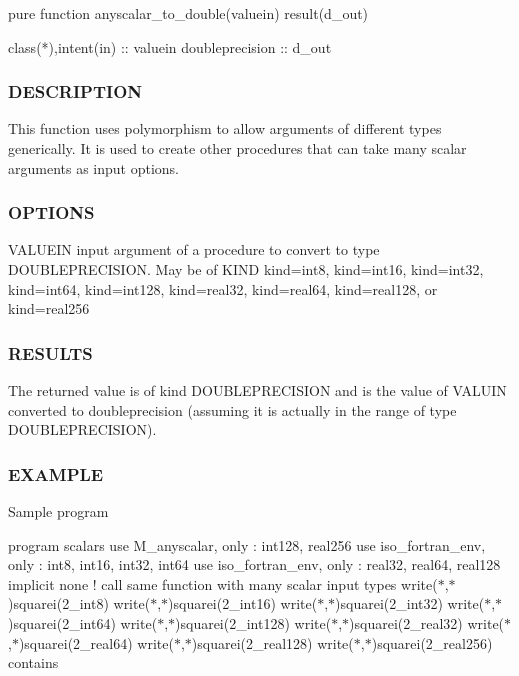 \begin{DoxyVerb}pure function anyscalar_to_double(valuein) result(d_out)

 class(*),intent(in)  :: valuein
 doubleprecision      :: d_out
\end{DoxyVerb}


\subsubsection*{D\+E\+S\+C\+R\+I\+P\+T\+I\+ON}

\begin{DoxyVerb}This function uses polymorphism to allow arguments of different types
generically. It is used to create other procedures that can take
many scalar arguments as input options.
\end{DoxyVerb}


\subsubsection*{O\+P\+T\+I\+O\+NS}

\begin{DoxyVerb}VALUEIN  input argument of a procedure to convert to type DOUBLEPRECISION.
         May be of KIND kind=int8, kind=int16, kind=int32, kind=int64,
         kind=int128, kind=real32, kind=real64, kind=real128,
         or kind=real256
\end{DoxyVerb}
 \subsubsection*{R\+E\+S\+U\+L\+TS}

The returned value is of kind D\+O\+U\+B\+L\+E\+P\+R\+E\+C\+I\+S\+I\+ON and is the value of V\+A\+L\+U\+IN converted to doubleprecision (assuming it is actually in the range of type D\+O\+U\+B\+L\+E\+P\+R\+E\+C\+I\+S\+I\+ON).

\subsubsection*{E\+X\+A\+M\+P\+LE}

Sample program

program scalars use M\+\_\+anyscalar, only \+: int128, real256 use iso\+\_\+fortran\+\_\+env, only \+: int8, int16, int32, int64 use iso\+\_\+fortran\+\_\+env, only \+: real32, real64, real128 implicit none ! call same function with many scalar input types write($\ast$,$\ast$)squarei(2\+\_\+int8) write($\ast$,$\ast$)squarei(2\+\_\+int16) write($\ast$,$\ast$)squarei(2\+\_\+int32) write($\ast$,$\ast$)squarei(2\+\_\+int64) write($\ast$,$\ast$)squarei(2\+\_\+int128) write($\ast$,$\ast$)squarei(2\+\_\+real32) write($\ast$,$\ast$)squarei(2\+\_\+real64) write($\ast$,$\ast$)squarei(2\+\_\+real128) write($\ast$,$\ast$)squarei(2\+\_\+real256) contains

